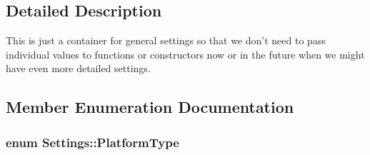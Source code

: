 \subsection{Detailed Description}
This is just a container for general settings so that we don't need to pass individual values to functions or constructors now or in the future when we might have even more detailed settings. 

\subsection{Member Enumeration Documentation}
\hypertarget{class_settings_a7c94920f2160a5cf261ce822a0ce2ee8}{
\subsubsection[{Platform\-Type}]{\setlength{\rightskip}{0pt plus 5cm}enum {\bf Settings\-::\-Platform\-Type}}}\label{class_settings_a7c94920f2160a5cf261ce822a0ce2ee8}
